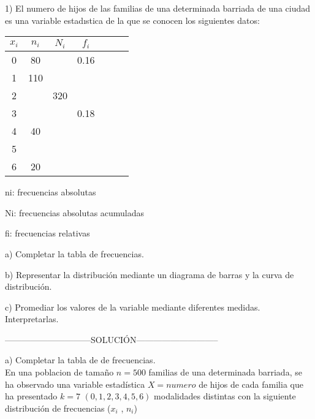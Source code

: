 \documentclass{article}
\begin{document}
	
		
	
\begin{table}[t]
	\begin{center}
		
			\begin{center}
				1)	El numero de hijos de las familias de una determinada barriada de una ciudad es una variable
		estadıstica de la que se conocen los siguientes datos:
		
			\end{center}
	
		\begin{tabular}{ | c | c | c | c | c | c | c | }
			
			
			\hline	
			$x_{i}$ & $n_{i}$ & $N_{i}$ & $f_{i}$ \\ \hline
			0 & 80 &  & 0.16 \\
			1 & 110 &  &  \\
			2 &  & 320 &  \\
			3 &  &  & 0.18 \\ 
			4 & 40 & &  \\
			5 & & & \\
			6 & 20 & & \\\hline
		\end{tabular}

\begin{flushright}
	\begin{center}
			ni: frecuencias absolutas
	
	Ni: frecuencias absolutas acumuladas
	
	fi: frecuencias relativas
	\end{center}
\end{flushright}

	\end{center}

a) Completar la tabla de frecuencias.

b) Representar la distribución mediante un diagrama de barras y la curva de distribución.

c) Promediar los valores de la variable mediante diferentes medidas. Interpretarlas.

\begin{center}
	------------------------------SOLUCIÓN-----------------------------
\end{center}

a) Completar la tabla de de  frecuencias.
\\

En una poblacion de tamaño $n = 500$ familias de una determinada barriada, se ha observado una variable estadística $ X = numero$  de hijos de cada familia que ha presentado $k = 7$ $(0,1,2,3,4,5,6)$ modalidades distintas con la siguiente distribución de frecuencias ($x_{i}$ , $n_{i}$)
	\begin{center}
		\begin{tabular}{ | c | c | c | c | c | c | c | }
	

\end{tabular}
\end{center}
\end{table}
\end{document}

